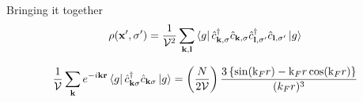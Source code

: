 \begin{frame}{Bringing it together}
\begin{equation*}
    \begin{gathered}
      \rho(\textbf{x}', \sigma') =
      \frac{1}{\mathcal{V}^2}
      \sum_{\textbf{k}, \textbf{l}}
      \bra{g} \hat{c}_{\textbf{k},\sigma}^{\dagger} \hat{c}_{\textbf{k},\sigma}
      \hat{c}_{\textbf{l},\sigma'}^\dagger \hat{c}_{\textbf{l},\sigma'} \ket{g}
    \end{gathered}
  \end{equation*}
  
  \begin{equation*}
    \frac{1}{\mathcal{V}} \sum_{\textbf{k}} e^{- i \textbf{k}\textbf{r}}
    \bra{g} \hat c^{\dagger}_{\textbf{k}\sigma} \hat c_{\textbf{k}\sigma} \ket{g} =
    \left ( \frac{N}{2\mathcal{V}} \right )
    \frac{3 \left \{ \sin(\text{k}_F r) - \text{k}_F r \cos(\text{k}_F r) \right \} }{(k_F r)^3}
  \end{equation*}

\end{frame}